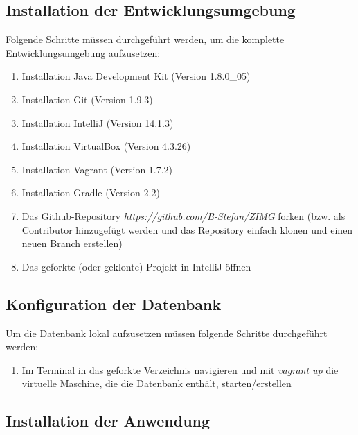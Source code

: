 \documentclass[12pt, oneside, a4paper]{article}		%
\begin{document}
\newpage

\subsection{Installation der Entwicklungsumgebung}

Folgende Schritte müssen durchgeführt werden, um die komplette Entwicklungsumgebung aufzusetzen:

\begin{enumerate}
	\item Installation Java Development Kit (Version 1.8.0\_05)
	\item Installation Git (Version 1.9.3)
	\item Installation IntelliJ (Version 14.1.3)
	\item Installation VirtualBox (Version 4.3.26)
	\item Installation Vagrant (Version 1.7.2)
	\item Installation Gradle (Version 2.2)
	\item Das Github-Repository \textit{https://github.com/B-Stefan/ZIMG} forken (bzw. als Contributor hinzugefügt werden und das Repository einfach klonen und einen neuen Branch erstellen)
	\item Das geforkte (oder geklonte) Projekt in IntelliJ öffnen
\end{enumerate}

\subsection{Konfiguration der Datenbank}

Um die Datenbank lokal aufzusetzen müssen folgende Schritte durchgeführt werden:

\begin{enumerate}
	\item Im Terminal in das geforkte Verzeichnis navigieren und mit \textit{vagrant up} die virtuelle Maschine, die die Datenbank enthält, starten/erstellen
\end{enumerate}

\subsection{Installation der Anwendung}
\end{document}
